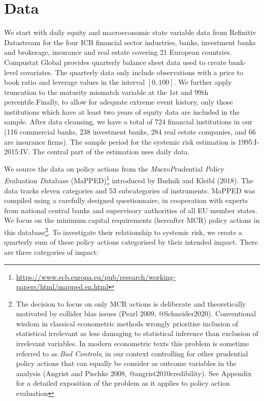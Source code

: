 \documentclass[
  10pt,
]{article}
\begin{document}
\hypertarget{data}{%
\section{Data}\label{data}}

We start with daily equity and macroeconomic state variable data from
Refinitiv Datastream for the four ICB financial sector industries,
banks, investment banks and brokerage, insurance and real estate
covering 21 European countries. Compustat Global provides quarterly
balance sheet data used to create bank-level covariates. The quarterly
data only include observations with a price to book ratio and leverage
values in the interval \([0, 100]\). We further apply truncation to the
maturity mismatch variable at the 1st and 99th percentile.Finally, to
allow for adequate extreme event history, only those institutions which
have at least two years of equity data are included in the sample. After
data cleansing, we have a total of 724 financial institutions in our
(116 commercial banks, 238 investment banks, 284 real estate companies,
and 66 are insurance firms). The sample period for the systemic risk
estimation is 1995:I-2015:IV. The central part of the estimation uses
daily data.

We source the data on policy actions from the
\emph{Ma}cro\emph{P}rudential \emph{P}olicy \emph{E}valuation
\emph{D}atabase (MaPPED)\footnote{\url{https://www.ecb.europa.eu/pub/research/working-papers/html/mapped.en.html}}
introduced by Budnik and Kleibl (2018). The data tracks eleven
categories and 53 subcategories of instruments. MaPPED was compiled
using a carefully designed questionnaire, in cooperation with experts
from national central banks and supervisory authorities of all EU member
states. We focus on the minimum capital requirements (hereafter MCR)
policy actions in this database\footnote{The decision to focus on only
  MCR actions is deliberate and theoretically motivated by collider bias
  issues (Pearl 2009, @Schneider2020). Conventional wisdom in classical
  econometric methods wrongly prioritise inclusion of statistical
  irrelevant as less damaging to statistical inference than exclusion of
  irrelevant variables. In modern econometric texts this problem is
  sometime referred to as \emph{Bad Controls}; in our context
  controlling for other prudential policy actions that can equally be
  consider as outcome variables in the analysis (Angrist and Pischke
  2008, @angrist2010credibility). See Appendix for a detailed exposition
  of the problem as it applies to policy action evaluation}. To
investigate their relationship to systemic risk, we create a quarterly
sum of these policy actions categorised by their intended impact. There
are three categories of impact:
\end{document}
